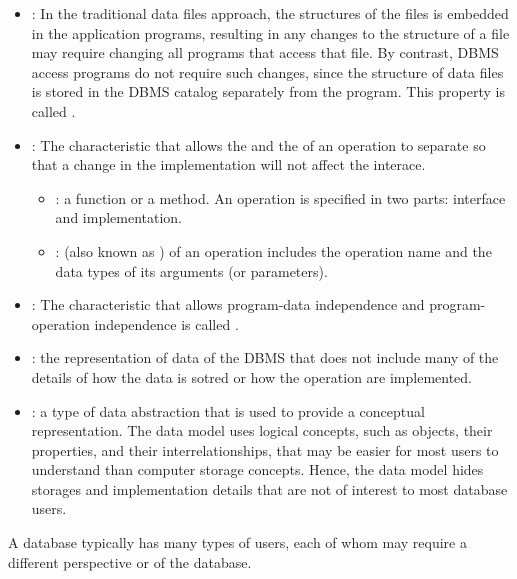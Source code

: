     \begin{itemize}
      \item {}: In the traditional data files
        approach, the structures of the files is embedded in the application
        programs, resulting in any changes to the structure of a file may
        require changing all programs that access that file. By contrast,
        DBMS access programs do not require such changes, since the structure
        of data files is stored in the DBMS catalog separately from the
        program. This property is called .
      \item {}: The characteristic that
        allows the  and the  of an operation
        to separate so that a change in the implementation will not affect the
        interace.
        \begin{itemize}
          \item {}: a function or a method. An operation is
            specified in two parts: interface and implementation.
          \item {}: (also known as ) of an
            operation includes the operation name and the data types of its
            arguments (or parameters).
        \end{itemize}
      \item {}: The characteristic that allows
        program-data independence and program-operation independence is
        called .
      \item {}: the representation of data of the
        DBMS that does not include many of the details of how the data is
        sotred or how the operation are implemented.
      \item {}: a type of data abstraction that is used to
        provide a conceptual representation. The data model uses logical
        concepts, such as objects, their properties, and their
        interrelationships, that may be easier for most users to understand
        than computer storage concepts. Hence, the data model hides storages
        and implementation details that are not of interest to most database
        users.
    \end{itemize}

    \par A database typically has many types of users, each of whom may
    require a different perspective or  of the database.

